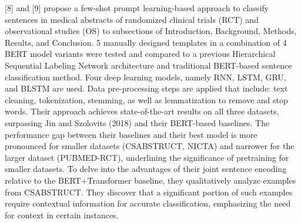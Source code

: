 \documentclass[conference]{IEEEtran}
\begin{document}
[8] and [9] propose a few-shot prompt learning-based approach to classify sentences in medical abstracts of randomized clinical trials (RCT) and observational studies (OS) to subsections of Introduction, Background, Methods, Results, and Conclusion. 5 manually designed templates in a combination of 4 BERT model variants were tested and compared to a previous Hierarchical Sequential Labeling Network architecture and traditional BERT-based sentence classification method. Four deep learning models, namely RNN, LSTM, GRU, and BLSTM are used. Data pre-processing steps are applied that include: text cleaning, tokenization, stemming, as well as lemmatization to remove and stop words. Their approach achieves state-of-the-art results on all three datasets, surpassing Jin and Szolovits (2018) and their BERT-based baselines. The performance gap between their baselines and their best model is more pronounced for smaller datasets (CSABSTRUCT, NICTA) and narrower for the larger dataset (PUBMED-RCT), underlining the significance of pretraining for smaller datasets. To delve into the advantages of their joint sentence encoding relative to the BERT+Transformer baseline, they qualitatively analyze examples from CSABSTRUCT. They discover that a significant portion of such examples require contextual information for accurate classification, emphasizing the need for context in certain instances.
\end{document}
